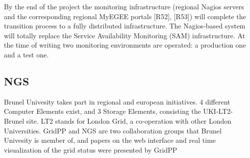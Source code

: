 By the end of the project the monitoring infrastructure (regional Nagios servers and the corresponding regional MyEGEE portals [R52], [R53]) will complete the transition process to a fully distributed infrastructure.
The Nagios-based system will totally replace the Service Availability Monitoring (SAM)
infrastructure. At the time of writing two monitoring environments are operated: a production one and a test one.
\newpage


\subsection{NGS}
Brunel Univesity takes part in regional and european initiatives. 4 different
Computer Elements exist, and 3 Storage Elements, consisting the UKI-LT2-Brunel
site. LT2 stands for London Grid, a co-operation with other London Universities.
GridPP and NGS are two collaboration groups that Brunel Univesity is member of,
and papers on the web interface \cite{Hobson2007} and real time visualization of
the grid status were presented \cite{Huang2007} by GridPP
